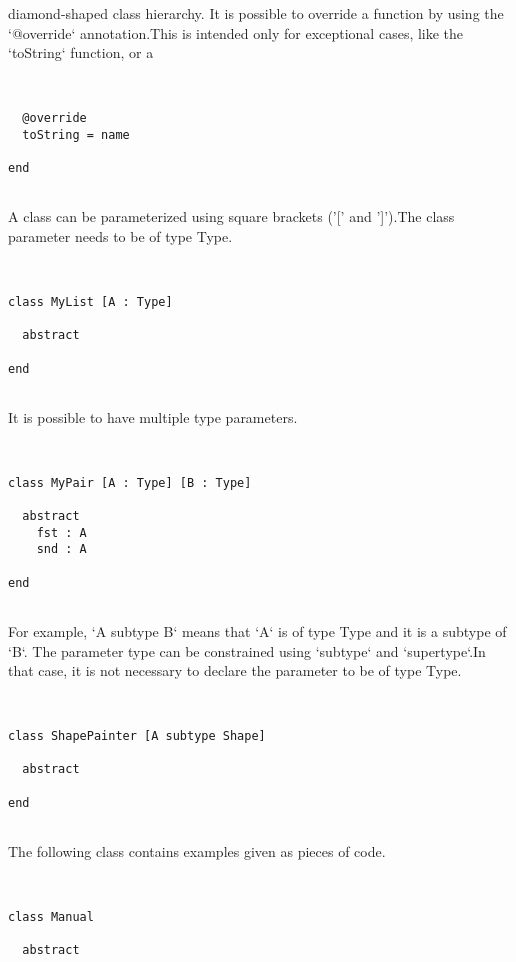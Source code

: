 \documentclass[12pt,a4paper]{article}
\begin{document}
diamond-shaped class hierarchy. It is possible to override a function by using the `@override` annotation.This is intended only for exceptional cases, like the `toString` function, or a


\begin{lstlisting}


  @override
  toString = name

end


\end{lstlisting}

A class can be parameterized using square brackets ('[' and ']').The class parameter needs to be of type Type. 


\begin{lstlisting}


class MyList [A : Type]

  abstract

end


\end{lstlisting}

It is possible to have multiple type parameters. 


\begin{lstlisting}


class MyPair [A : Type] [B : Type]

  abstract
    fst : A
    snd : A

end


\end{lstlisting}

For example, `A subtype B` means that `A` is of type Type and it is a subtype of `B`. The parameter type can be constrained using `subtype` and `supertype`.In that case, it is not necessary to declare the parameter to be of type Type.


\begin{lstlisting}


class ShapePainter [A subtype Shape]

  abstract

end


\end{lstlisting}

The following class contains examples given as pieces of code. 


\begin{lstlisting}


class Manual

  abstract


\end{lstlisting}
\end{document}
